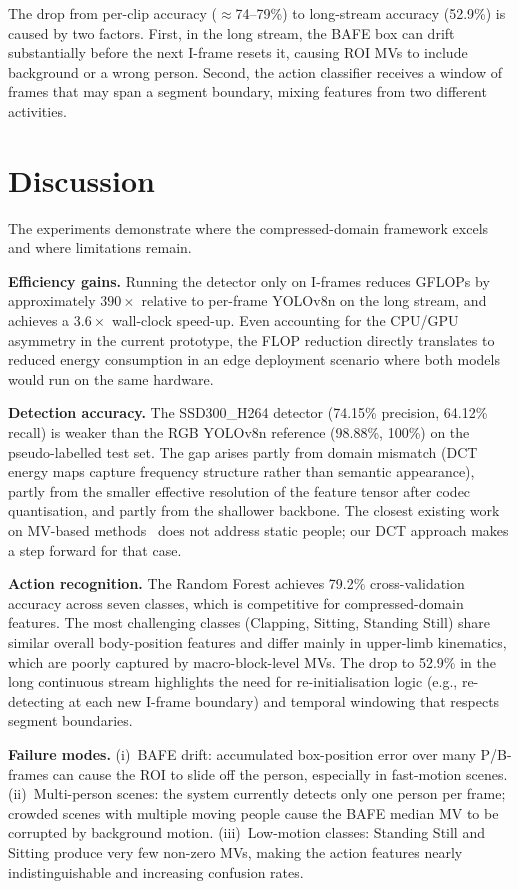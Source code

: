\documentclass[conference]{IEEEtran}
\begin{document}
The drop from per-clip accuracy ($\approx$74--79\%) to long-stream accuracy (52.9\%) is caused by two factors. First, in the long stream, the BAFE box can drift substantially before the next I-frame resets it, causing ROI MVs to include background or a wrong person. Second, the action classifier receives a window of frames that may span a segment boundary, mixing features from two different activities.

\section{Discussion}

The experiments demonstrate where the compressed-domain framework excels and where limitations remain.

\textbf{Efficiency gains.} Running the detector only on I-frames reduces GFLOPs by approximately $390\!\times$ relative to per-frame YOLOv8n on the long stream, and achieves a $3.6\!\times$ wall-clock speed-up. Even accounting for the CPU/GPU asymmetry in the current prototype, the FLOP reduction directly translates to reduced energy consumption in an edge deployment scenario where both models would run on the same hardware.

\textbf{Detection accuracy.} The SSD300\_H264 detector (74.15\% precision, 64.12\% recall) is weaker than the RGB YOLOv8n reference (98.88\%, 100\%) on the pseudo-labelled test set. The gap arises partly from domain mismatch (DCT energy maps capture frequency structure rather than semantic appearance), partly from the smaller effective resolution of the feature tensor after codec quantisation, and partly from the shallower backbone. The closest existing work on MV-based methods~\cite{duche2026see} does not address static people; our DCT approach makes a step forward for that case.

\textbf{Action recognition.} The Random Forest achieves 79.2\% cross-validation accuracy across seven classes, which is competitive for compressed-domain features. The most challenging classes (Clapping, Sitting, Standing Still) share similar overall body-position features and differ mainly in upper-limb kinematics, which are poorly captured by macro-block-level MVs. The drop to 52.9\% in the long continuous stream highlights the need for re-initialisation logic (e.g., re-detecting at each new I-frame boundary) and temporal windowing that respects segment boundaries.

\textbf{Failure modes.} (i)~BAFE drift: accumulated box-position error over many P/B-frames can cause the ROI to slide off the person, especially in fast-motion scenes. (ii)~Multi-person scenes: the system currently detects only one person per frame; crowded scenes with multiple moving people cause the BAFE median MV to be corrupted by background motion. (iii)~Low-motion classes: Standing Still and Sitting produce very few non-zero MVs, making the action features nearly indistinguishable and increasing confusion rates.
\end{document}
